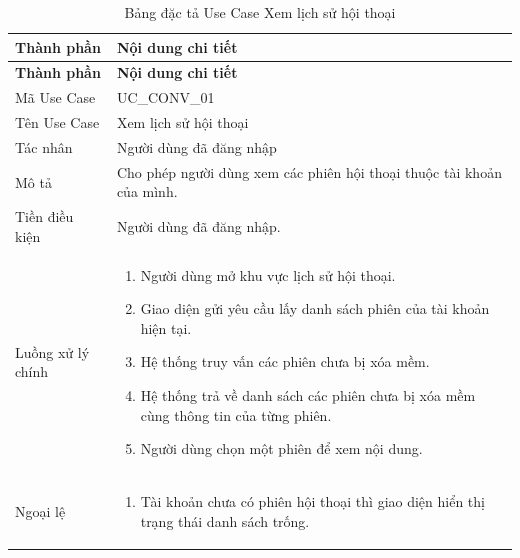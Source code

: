 \documentclass[12pt,a4paper,oneside]{report}
\begin{document}
{
  \begin{longtable}{|L{3.6cm}|L{11.2cm}|}
    \caption{Bảng đặc tả Use Case Xem lịch sử hội thoại}\label{tab:uc-conv-list}                                  \\
    \hline
    \textbf{Thành phần} & \textbf{Nội dung chi tiết}                                                                \\
    \hline
    \endfirsthead
    \hline
    \textbf{Thành phần} & \textbf{Nội dung chi tiết}                                                                \\
    \hline
    \endhead
    Mã Use Case       & UC\_CONV\_01                                                                              \\
    \hline
    Tên Use Case      & Xem lịch sử hội thoại                                                                     \\
    \hline
    Tác nhân            & Người dùng đã đăng nhập                                                                   \\
    \hline
    Mô tả               & Cho phép người dùng xem các phiên hội thoại thuộc tài khoản của mình.                     \\
    \hline
    Tiền điều kiện      & Người dùng đã đăng nhập.                                                                  \\
    \hline
    Luồng xử lý chính   & \begin{enumerate}[leftmargin=*,nosep]
                            \item Người dùng mở khu vực lịch sử hội thoại.
                            \item Giao diện gửi yêu cầu lấy danh sách phiên của tài khoản hiện tại.
                            \item Hệ thống truy vấn các phiên chưa bị xóa mềm.
                            \item Hệ thống trả về danh sách các phiên chưa bị xóa mềm cùng thông tin của từng phiên.
                            \item Người dùng chọn một phiên để xem nội dung.
                          \end{enumerate}   \\
    \hline
    Ngoại lệ            & \begin{enumerate}[leftmargin=*,nosep]
                            \item Tài khoản chưa có phiên hội thoại thì giao diện hiển thị trạng thái danh sách trống.

\end{enumerate}
\end{longtable}}
\end{document}
